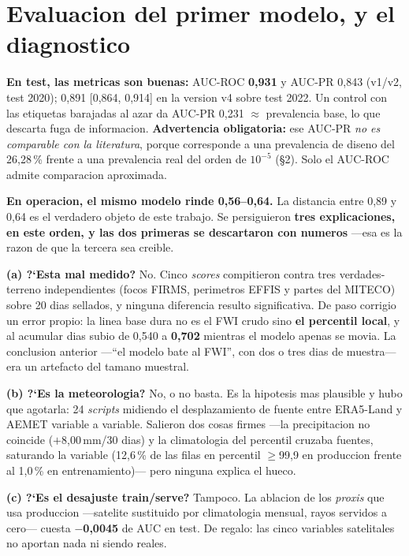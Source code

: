 \documentclass[10pt,a4paper]{article}
\begin{document}
\section{Evaluacion del primer modelo, y el diagnostico}

\textbf{En test, las metricas son buenas:} AUC-ROC \textbf{0,931} y AUC-PR 0,843 (v1/v2, test 2020);
0,891 [0,864, 0,914] en la version v4 sobre test 2022. Un control con las etiquetas barajadas al
azar da AUC-PR 0,231 $\approx$ prevalencia base, lo que descarta fuga de informacion.
\textbf{Advertencia obligatoria:} ese AUC-PR \emph{no es comparable con la literatura}, porque
corresponde a una prevalencia de diseno del 26,28\,\% frente a una prevalencia real del orden de
$10^{-5}$ (\S2). Solo el AUC-ROC admite comparacion aproximada.

\textbf{En operacion, el mismo modelo rinde 0,56--0,64.} La distancia entre 0,89 y 0,64 es el
verdadero objeto de este trabajo. Se persiguieron \textbf{tres explicaciones, en este orden, y las
dos primeras se descartaron con numeros} ---esa es la razon de que la tercera sea creible.

\textbf{(a) ?`Esta mal medido?} No. Cinco \emph{scores} compitieron contra tres verdades-terreno
independientes (focos FIRMS, perimetros EFFIS y partes del MITECO) sobre 20 dias sellados, y
ninguna diferencia resulto significativa. De paso corrigio un error propio: la linea base dura no
es el FWI crudo sino \textbf{el percentil local}, y al acumular dias subio de 0,540 a \textbf{0,702}
mientras el modelo apenas se movia. La conclusion anterior ---``el modelo bate al FWI'', con dos o
tres dias de muestra--- era un artefacto del tamano muestral.

\textbf{(b) ?`Es la meteorologia?} No, o no basta. Es la hipotesis mas plausible y hubo que
agotarla: 24 \emph{scripts} midiendo el desplazamiento de fuente entre ERA5-Land y AEMET variable a
variable. Salieron dos cosas firmes ---la precipitacion no coincide ($+$8,00\,mm/30 dias) y la
climatologia del percentil cruzaba fuentes, saturando la variable (12,6\,\% de las filas en
percentil $\geq$99,9 en produccion frente al 1,0\,\% en entrenamiento)--- pero ninguna explica el
hueco.

\textbf{(c) ?`Es el desajuste train/serve?} Tampoco. La ablacion de los \emph{proxis} que usa
produccion ---satelite sustituido por climatologia mensual, rayos servidos a cero--- cuesta
\textbf{$-$0,0045} de AUC en test. De regalo: las cinco variables satelitales no aportan nada ni
siendo reales.
\end{document}
